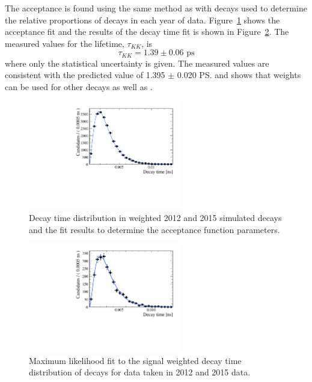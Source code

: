 The \bskk acceptance is found using the same method as \bsmumu with \bsjpsiphi decays used to determine the relative proportions of decays in each year of data. Figure~\ref{fig:bskkacceptancefit} shows the acceptance fit and the results of the decay time fit is shown in Figure~\ref{fig:bskklifetimefit}. The measured values for the lifetime, $\tau_{KK}$, is
\begin{equation}
\tau_{KK} = 1.39 \pm 0.06  \text{ ps} 
\end{equation}
where only the statistical uncertainty is given.%
The measured values are consistent with the predicted value of 1.395 $\pm$ 0.020 \ps \cite{Aaij:2014fia} and shows that \bdkpi weights can be used for other decays as well as \bdkpi. 

\begin{figure}[htbp]
\centering
  \includegraphics[width=0.6\textwidth]{./Figs/LifetimeSystematics/Bs2KK_acceptance_Fit.pdf}
\caption{Decay time distribution in weighted 2012 and 2015 simulated decays and the fit  results to determine the acceptance function parameters. }
\label{fig:bskkacceptancefit}
\end{figure}

\begin{figure}[htbp]
\centering
  \includegraphics[width=0.6\textwidth]{./Figs/LifetimeSystematics/Bd2KPi_lifetime_fit.pdf}
\caption{Maximum likelihood fit to the signal weighted decay time distribution of \bskk decays for data taken in 2012 and 2015 data. }
\label{fig:bskklifetimefit}
\end{figure}

